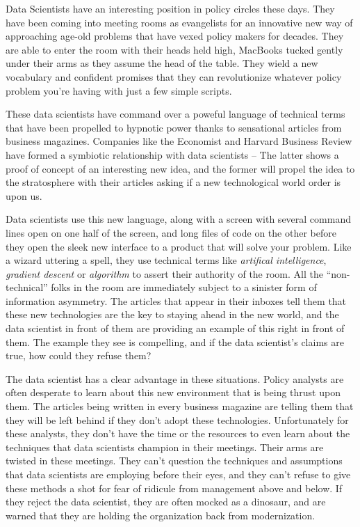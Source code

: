\documentclass[]{book}
\begin{document}
Data Scientists have an interesting position in policy circles these days. They have been coming into meeting rooms as evangelists for an innovative new way of approaching age-old problems that have vexed policy makers for decades. They are able to enter the room with their heads held high, MacBooks tucked gently under their arms as they assume the head of the table. They wield a new vocabulary and confident promises that they can revolutionize whatever policy problem you're having with just a few simple scripts.

These data scientists have command over a poweful language of technical terms that have been propelled to hypnotic power thanks to sensational articles from business magazines. Companies like the Economist and Harvard Business Review have formed a symbiotic relationship with data scientists -- The latter shows a proof of concept of an interesting new idea, and the former will propel the idea to the stratosphere with their articles asking if a new technological world order is upon us.

Data scientists use this new language, along with a screen with several command lines open on one half of the screen, and long files of code on the other before they open the sleek new interface to a product that will solve your problem. Like a wizard uttering a spell, they use technical terms like \emph{artifical intelligence}, \emph{gradient descent} or \emph{algorithm} to assert their authority of the room. All the ``non-technical'' folks in the room are immediately subject to a sinister form of information asymmetry. The articles that appear in their inboxes tell them that these new technologies are the key to staying ahead in the new world, and the data scientist in front of them are providing an example of this right in front of them. The example they see is compelling, and if the data scientist's claims are true, how could they refuse them?

The data scientist has a clear advantage in these situations. Policy analysts are often desperate to learn about this new environment that is being thrust upon them. The articles being written in every business magazine are telling them that they will be left behind if they don't adopt these technologies. Unfortunately for these analysts, they don't have the time or the resources to even learn about the techniques that data scientists champion in their meetings. Their arms are twisted in these meetings. They can't question the techniques and assumptions that data scientists are employing before their eyes, and they can't refuse to give these methods a shot for fear of ridicule from management above and below. If they reject the data scientist, they are often mocked as a dinosaur, and are warned that they are holding the organization back from modernization.
\end{document}
